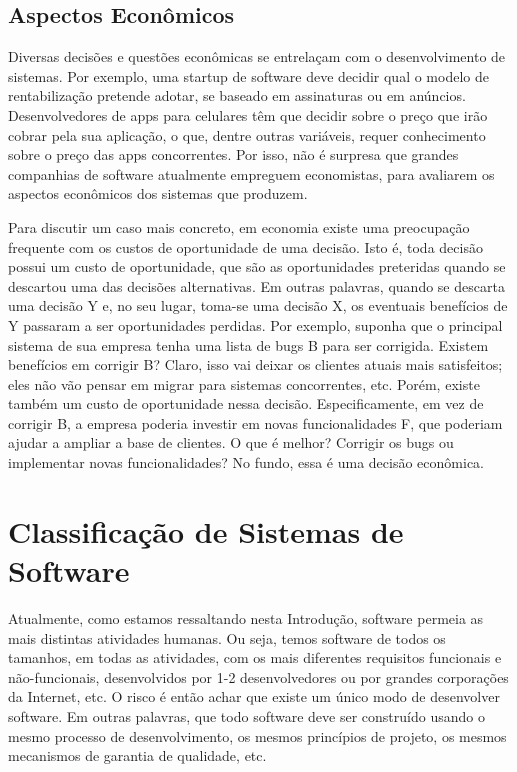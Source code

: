 \documentclass[
  11pt,
  twoside]{book}
\begin{document}
\hypertarget{aspectos-econuxf4micos}{%
\subsection{Aspectos Econômicos}\label{aspectos-econuxf4micos}}

 Diversas decisões e questões econômicas se
entrelaçam com o desenvolvimento de sistemas. Por exemplo, uma startup
de software deve decidir qual o modelo de rentabilização pretende
adotar, se baseado em assinaturas ou em anúncios. Desenvolvedores de
apps para celulares têm que decidir sobre o preço que irão cobrar pela
sua aplicação, o que, dentre outras variáveis, requer conhecimento sobre
o preço das apps concorrentes. Por isso, não é surpresa que grandes
companhias de software atualmente empreguem economistas, para avaliarem
os aspectos econômicos dos sistemas que produzem.

Para discutir um caso mais concreto, em economia existe uma preocupação
frequente com os custos de oportunidade de uma decisão. Isto é, toda
decisão possui um custo de oportunidade, que são as oportunidades
preteridas quando se descartou uma das decisões alternativas. Em outras
palavras, quando se descarta uma decisão Y e, no seu lugar, toma-se uma
decisão X, os eventuais benefícios de Y passaram a ser oportunidades
perdidas. Por exemplo, suponha que o principal sistema de sua empresa
tenha uma lista de bugs B para ser corrigida. Existem benefícios em
corrigir B? Claro, isso vai deixar os clientes atuais mais satisfeitos;
eles não vão pensar em migrar para sistemas concorrentes, etc. Porém,
existe também um custo de oportunidade nessa decisão. Especificamente,
em vez de corrigir B, a empresa poderia investir em novas
funcionalidades F, que poderiam ajudar a ampliar a base de clientes. O
que é melhor? Corrigir os bugs ou implementar novas funcionalidades? No
fundo, essa é uma decisão econômica.

\hypertarget{classificauxe7uxe3o-de-sistemas-de-software}{%
\section{Classificação de Sistemas de
Software}\label{classificauxe7uxe3o-de-sistemas-de-software}}

 Atualmente, como estamos ressaltando nesta
Introdução, software permeia as mais distintas atividades humanas. Ou
seja, temos software de todos os tamanhos, em todas as atividades, com
os mais diferentes requisitos funcionais e não-funcionais, desenvolvidos
por 1-2 desenvolvedores ou por grandes corporações da Internet, etc. O
risco é então achar que existe um único modo de desenvolver software. Em
outras palavras, que todo software deve ser construído usando o mesmo
processo de desenvolvimento, os mesmos princípios de projeto, os mesmos
mecanismos de garantia de qualidade, etc.
\end{document}
